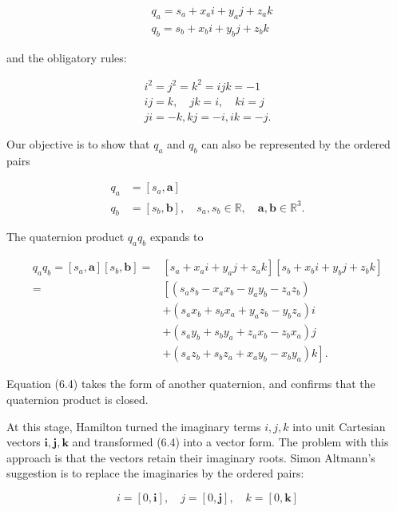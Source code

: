 \documentclass[10pt]{article}
\begin{document}
$$
\begin{aligned}
& q_{a}=s_{a}+x_{a} i+y_{a} j+z_{a} k \\
& q_{b}=s_{b}+x_{b} i+y_{b} j+z_{b} k
\end{aligned}
$$

and the obligatory rules:

$$
\begin{gathered}
i^{2}=j^{2}=k^{2}=i j k=-1 \\
i j=k, \quad j k=i, \quad k i=j \\
j i=-k, k j=-i, i k=-j .
\end{gathered}
$$

Our objective is to show that $q_{a}$ and $q_{b}$ can also be represented by the ordered pairs

$$
\begin{aligned}
q_{a} & =\left[s_{a}, \mathbf{a}\right] \\
q_{b} & =\left[s_{b}, \mathbf{b}\right], \quad s_{a}, s_{b} \in \mathbb{R}, \quad \mathbf{a}, \mathbf{b} \in \mathbb{R}^{3} .
\end{aligned}
$$

The quaternion product $q_{a} q_{b}$ expands to

$$
\begin{aligned}
q_{a} q_{b}=\left[s_{a}, \mathbf{a}\right]\left[s_{b}, \mathbf{b}\right]= & {\left[s_{a}+x_{a} i+y_{a} j+z_{a} k\right]\left[s_{b}+x_{b} i+y_{b} j+z_{b} k\right] } \\
= & {\left[\left(s_{a} s_{b}-x_{a} x_{b}-y_{a} y_{b}-z_{a} z_{b}\right)\right.} \\
& +\left(s_{a} x_{b}+s_{b} x_{a}+y_{a} z_{b}-y_{b} z_{a}\right) i \\
& +\left(s_{a} y_{b}+s_{b} y_{a}+z_{a} x_{b}-z_{b} x_{a}\right) j \\
& \left.+\left(s_{a} z_{b}+s_{b} z_{a}+x_{a} y_{b}-x_{b} y_{a}\right) k\right] .
\end{aligned}
$$

Equation (6.4) takes the form of another quaternion, and confirms that the quaternion product is closed.

At this stage, Hamilton turned the imaginary terms $i, j, k$ into unit Cartesian vectors $\mathbf{i}, \mathbf{j}, \mathbf{k}$ and transformed (6.4) into a vector form. The problem with this approach is that the vectors retain their imaginary roots. Simon Altmann's suggestion is to replace the imaginaries by the ordered pairs:

$$
i=[0, \mathbf{i}], \quad j=[0, \mathbf{j}], \quad k=[0, \mathbf{k}]
$$
\end{document}
